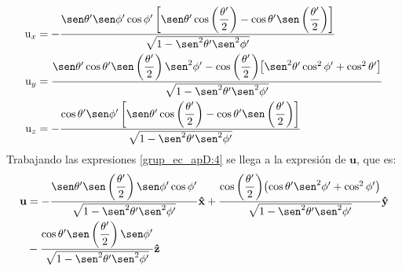 \begin{subequations}
\label{grup_ec_apD:4}
\begin{align}
{\text{u}}_x &= -\dfrac{\sen\theta '\sen\phi '\cos\phi '\left[\sen\theta '\cos\left(\dfrac{\theta '}{2}\right) - \cos\theta '\sen\left(\dfrac{\theta '}{2}\right)\right]}{\sqrt{1 - \sen^2\theta '\sen^2\phi '}}
\label{ec_apD:35}\\
{\text{u}}_y &= \dfrac{\sen\theta '\cos\theta '\sen\left(\dfrac{\theta '}{2}\right)\sen^2\phi ' - \cos\left(\dfrac{\theta '}{2}\right)\!\left[\sen^2\theta '\cos^2\phi ' + \cos^2\theta '\right]}{\sqrt{1 - \sen^2\theta '\sen^2\phi '}}
\label{ec_apD:36}\\
{\text{u}}_z &= -\dfrac{\cos\theta '\sen\phi '\left[\sen\theta '\cos\left(\dfrac{\theta '}{2}\right) - \cos\theta '\sen\left(\dfrac{\theta '}{2}\right)\right]}{\sqrt{1 - \sen^2\theta '\sen^2\phi '}}
\label{ec_apD:37}
\end{align}
\end{subequations}
Trabajando las expresiones \eqref{grup_ec_apD:4} se llega a la expresión de $\mathbf{u}$, que es:
\begin{align}
\begin{split}
\mathbf{u} &= -\dfrac{\sen\theta '\sen\left(\dfrac{\theta '}{2}\right)\sen\phi '\cos\phi '}{\sqrt{1 - \sen^2\theta '\sen^2\phi '}}\versor{x} + \dfrac{\cos\left(\dfrac{\theta '}{2}\right)\!\left(\cos\theta '\sen^2\phi ' + \cos^2\phi '\right)}{\sqrt{1 - \sen^2\theta '\sen^2\phi '}}\versor{y}\\
&-\dfrac{\cos\theta '\sen\left(\dfrac{\theta '}{2}\right)\sen\phi '}{\sqrt{1 - \sen^2\theta '\sen^2\phi '}}\versor{z}
\label{ec_apD:38}
\end{split}
\end{align}
